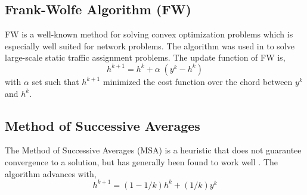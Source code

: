\subsection{Frank-Wolfe Algorithm (FW)}
FW 
\cite{fukushima1984modified} 
is a well-known method for solving convex optimization problems which is especially well suited for network problems. The algorithm was used in \cite{thai2016negative} to solve large-scale static traffic assignment problems. The update function of FW is,
\begin{equation}
h^{k+1} = h^k +\alpha\; (y^k - h^k)
\end{equation}
with $\alpha$ set such that $h^{k+1}$ minimized the cost function over the chord between 
$y^k$ and $h^k$.



\subsection{Method of Successive Averages}
The Method of Successive Averages (MSA) is a heuristic that does not guarantee convergence to a solution, but has generally been found to work well \cite{nie2010solving}. The algorithm advances with,
\begin{equation}
h^{k+1} = (1-1/k)h^k + (1/k) y^k
\end{equation}



